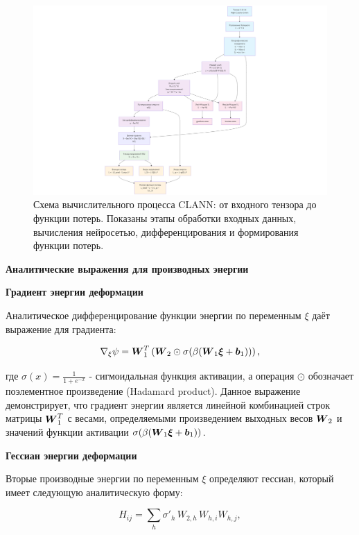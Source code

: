 \begin{figure}[htbp]
\centering
\includegraphics[width=1.3\textwidth]{img/clann_arc.png}
\caption{Схема вычислительного процесса CLANN: от входного тензора до функции потерь. Показаны этапы обработки входных данных, вычисления нейросетью, дифференцирования и формирования функции потерь.}
\label{fig:clann_architecture}
\end{figure}

\textbf{Аналитические выражения для производных энергии}

\textbf{Градиент энергии деформации}

Аналитическое дифференцирование функции энергии по переменным \(\xi\) даёт выражение для градиента:

\begin{equation}
 \nabla_\xi \psi = \boldsymbol{W}_1^T \left( \boldsymbol{W}_2 \odot \sigma(\beta (\boldsymbol{W}_1 \boldsymbol{\xi} + \boldsymbol{b}_1)) \right),
\label{eq:energy_gradient}
\end{equation}

где $\sigma(x) = \frac{1}{1 + e^{-x}}$ - сигмоидальная функция активации, 
а операция $\odot$ обозначает поэлементное произведение (Hadamard product). 
Данное выражение демонстрирует, что градиент энергии является линейной комбинацией строк матрицы $\boldsymbol{W}_1^T$ с весами, 
определяемыми произведением выходных весов $\boldsymbol{W}_2$ и значений функции активации $\sigma(\beta (\boldsymbol{W}_1 \boldsymbol{\xi} + \boldsymbol{b}_1))$.

\textbf{Гессиан энергии деформации}

Вторые производные энергии по переменным \(\xi\) определяют гессиан, который имеет следующую аналитическую форму:

\begin{equation}
 H_{ij} = \sum_h \sigma'_h\,W_{2,h}\,W_{h,i}W_{h,j},
\label{eq:energy_hessian}
\end{equation}

